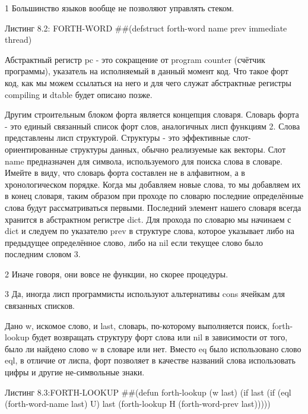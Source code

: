 1 Большинство языков вообще не позволяют управлять стеком.

Листинг 8.2: FORTH-WORD
##(defstruct forth-word
name prev immediate thread) 

Абстрактный регистр pc - это сокращение от program counter (счётчик программы), указатель на исполняемый в данный момент код. Что такое форт код, как мы можем ссылаться на него и для чего служат абстрактные регистры compiling и dtable будет описано позже.

Другим строительным блоком форта является концепция словаря. Словарь форта - это единый связанный список форт слов, аналогичных лисп функциям 2. Слова представлены лисп структурой. Структуры - это эффективные слот-ориентированные структуры данных, обычно реализуемые как векторы. Слот name предназначен для символа, используемого для поиска слова в словаре. Имейте в виду, что словарь форта составлен не в алфавитном, а в хронологическом порядке. Когда мы добавляем новые слова, то мы добавляем их в конец словаря, таким образом при проходе по словарю последние определённые слова будут рассматриваться первыми. Последний элемент нашего словаря всегда хранится в абстрактном регистре dict. Для прохода по словарю мы начинаем с dict и следуем по указателю prev в структуре слова, которое указывает либо на предыдущее определённое слово, либо на nil если текущее слово было последним словом 3.

2 Иначе говоря, они вовсе не функции, но скорее процедуры.

3 Да, иногда лисп программисты используют альтернативы cons ячейкам для связанных списков.

Дано w, искомое слово, и last, словарь, по-которому выполняется поиск, forth-lookup будет возвращать структуру форт слова или nil в зависимости от того, было ли найдено слово w в словаре или нет. Вместо eq было использовано слово eql, в отличие от лиспа, форт позволяет в качестве названий слова использовать цифры и другие не-символьные знаки.

Листинг 8.3:FORTH-LOOKUP
##(defun forth-lookup (w last)
(if last
(if (eql (forth-word-name last) U)
last
(forth-lookup
H (forth-word-prev last))))) 

